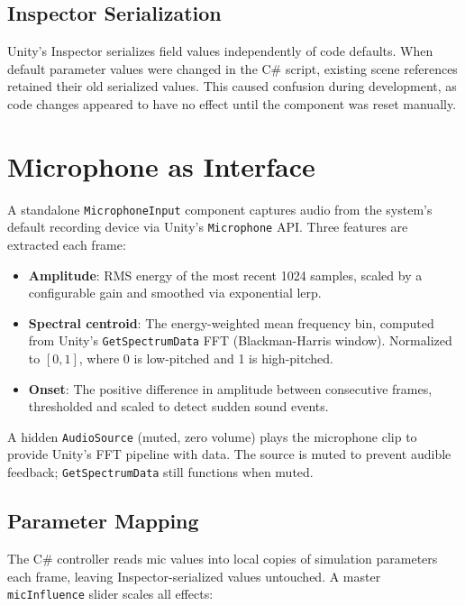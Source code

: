 \documentclass[12pt, titlepage]{article}
\begin{document}
\subsection{Inspector Serialization}

Unity's Inspector serializes field values independently of code defaults. When
default parameter values were changed in the C\# script, existing scene
references retained their old serialized values. This caused confusion during
development, as code changes appeared to have no effect until the component was
reset manually.

\section{Microphone as Interface}
\label{sec:mic}

A standalone \texttt{MicrophoneInput} component captures audio from the
system's default recording device via Unity's \texttt{Microphone} API. Three
features are extracted each frame:

\begin{itemize}
    \item \textbf{Amplitude}: RMS energy of the most recent 1024 samples,
    scaled by a configurable gain and smoothed via exponential lerp.
    \item \textbf{Spectral centroid}: The energy-weighted mean frequency bin,
    computed from Unity's \texttt{GetSpectrumData} FFT (Blackman-Harris
    window). Normalized to $[0, 1]$, where 0 is low-pitched and 1 is
    high-pitched.
    \item \textbf{Onset}: The positive difference in amplitude between
    consecutive frames, thresholded and scaled to detect sudden sound events.
\end{itemize}

A hidden \texttt{AudioSource} (muted, zero volume) plays the microphone clip
to provide Unity's FFT pipeline with data. The source is muted to prevent
audible feedback; \texttt{GetSpectrumData} still functions when muted.

\subsection{Parameter Mapping}

The C\# controller reads mic values into local copies of simulation parameters
each frame, leaving Inspector-serialized values untouched. A master
\texttt{micInfluence} slider scales all effects:
\end{document}
